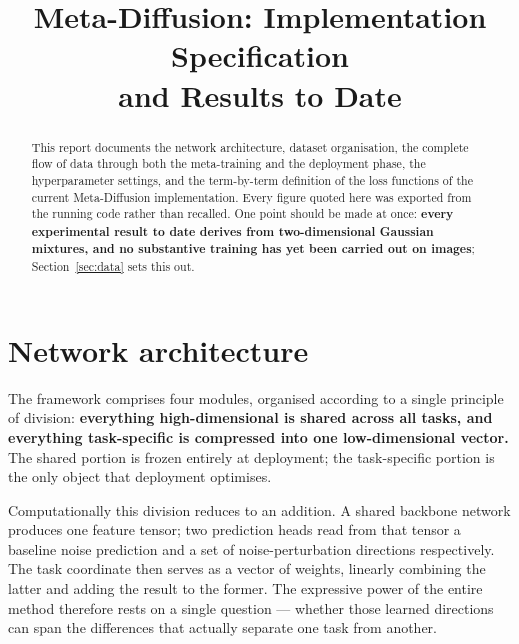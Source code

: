 \documentclass[11pt]{article}
\title{Meta-Diffusion: Implementation Specification\\and Results to Date}
\author{}
\date{}
\begin{document}
\maketitle

\begin{abstract}
\noindent
This report documents the network architecture, dataset organisation, the complete flow of data
through both the meta-training and the deployment phase, the hyperparameter settings, and the
term-by-term definition of the loss functions of the current Meta-Diffusion implementation. Every
figure quoted here was exported from the running code rather than recalled. One point should be
made at once: \textbf{every experimental result to date derives from two-dimensional Gaussian
mixtures, and no substantive training has yet been carried out on images}; Section~\ref{sec:data}
sets this out.
\end{abstract}

\tableofcontents
\bigskip

\section{Network architecture}
\label{sec:arch}

The framework comprises four modules, organised according to a single principle of division:
\textbf{everything high-dimensional is shared across all tasks, and everything task-specific is
compressed into one low-dimensional vector.} The shared portion is frozen entirely at deployment;
the task-specific portion is the only object that deployment optimises.

Computationally this division reduces to an addition. A shared backbone network produces one feature
tensor; two prediction heads read from that tensor a baseline noise prediction and a set of
noise-perturbation directions respectively. The task coordinate then serves as a vector of weights,
linearly combining the latter and adding the result to the former. The expressive power of the
entire method therefore rests on a single question --- whether those learned directions can span the
differences that actually separate one task from another.
\end{document}
